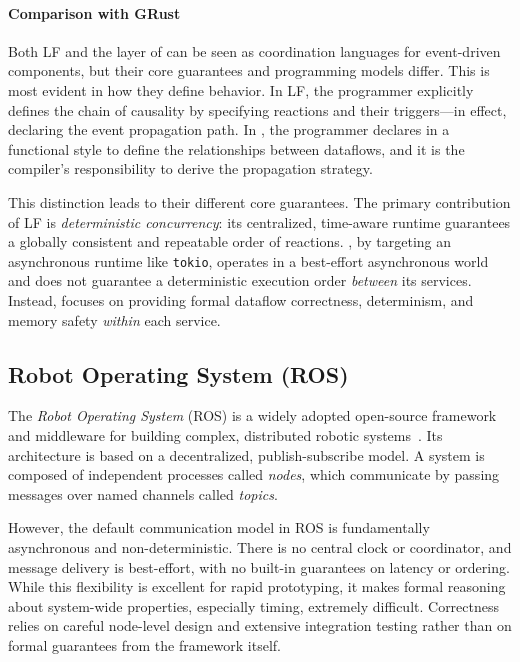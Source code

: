 \paragraph*{Comparison with GRust}
Both LF and the \GRFRP layer of \GRust can be seen as coordination languages for event-driven
components, but their core guarantees and programming models differ. This is most evident in
how they define behavior. In LF, the programmer explicitly defines the chain of causality by
specifying reactions and their triggers---in effect, declaring the event propagation path. In
\GRFRP, the programmer declares in a functional style to define the relationships between
dataflows, and it is the compiler's responsibility to derive the propagation strategy.

This distinction leads to their different core guarantees. The primary contribution of LF is
\emph{deterministic concurrency}: its centralized, time-aware runtime guarantees a globally
consistent and repeatable order of reactions. \GRust, by targeting an asynchronous runtime like
\texttt{tokio}, operates in a best-effort asynchronous world and does not guarantee a deterministic
execution order \emph{between} its services. Instead, \GRust focuses on providing formal dataflow
correctness, determinism, and memory safety \emph{within} each service.

\subsection{Robot Operating System (ROS)}
\label{sec:sota:distributed:ros}

The \emph{Robot Operating System} (ROS) is a widely adopted open-source framework and middleware for
building complex, distributed robotic systems~\cite{ros}. Its architecture is based on a
decentralized, publish-subscribe model. A system is composed of independent processes called
\emph{nodes}, which communicate by passing messages over named channels called \emph{topics}.

However, the default communication model in ROS is fundamentally asynchronous and non-deterministic.
There is no central clock or coordinator, and message delivery is best-effort, with no built-in
guarantees on latency or ordering. While this flexibility is excellent for rapid prototyping, it
makes formal reasoning about system-wide properties, especially timing, extremely difficult.
Correctness relies on careful node-level design and extensive integration testing rather than on
formal guarantees from the framework itself.

